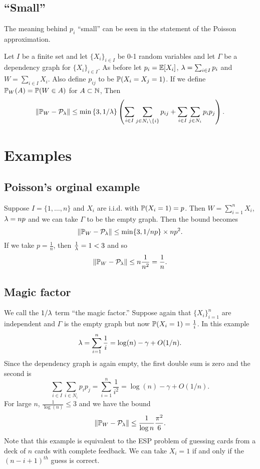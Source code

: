 \subsection{``Small''}
The meaning behind $p_i$ ``small'' can be seen in the statement of the Poisson approximation.
\begin{thrm}
    Let $I$ be a finite set and let $\{X_i\}_{i\in I}$ be 0-1 random variables and let $\Gamma$ be a dependency graph for $\{X_i\}_{i \in I}$. As before let $p_i = {\mathbb{E}}[X_i]$, $\lambda = \sum_{i \in I} p_i$ and $W = \sum_{i \in I}X_i$. Also define $p_{ij}$ to be ${\mathbb{P}}(X_i=X_j=1)$. If we define ${\mathbb{P}}_W(A) = {\mathbb{P}}(W \in A)$ for $A \subset {{\mathbb N}}$, Then 
    \[\left\|{\mathbb{P}}_W-{\mathcal{P}}_\lambda\right\| \le \min\left\{3, 1/\lambda\right\}\left(\sum_{i \in I}\sum_{j \in N_i \setminus \{i\}} p_{ij}+\sum_{i\in I}\sum_{j \in N_i}p_ip_j\right).\]
\end{thrm}
\section{Examples}
\subsection{Poisson's orginal example}
Suppose $I = \{1,\ldots,n\}$ and $X_i$ are i.i.d. with ${\mathbb{P}}(X_i=1)=p$. Then $W = \sum_{i=1}^n X_i$, $\lambda = np$ and we can take $\Gamma$ to be the empty graph. Then the bound becomes 
\[\left\|{\mathbb{P}}_W-{\mathcal{P}}_\lambda\right\| \le \min\{3,1/np\} \times np^2. \]
If we take $p = \frac{1}{n}$, then $\frac{1}{\lambda}=1<3$ and so 
\[\left\|{\mathbb{P}}_W - {\mathcal{P}}_\lambda\right\| \le n\frac{1}{n^2}=\frac{1}{n}. \]
\subsection{Magic factor}
We call the $1/\lambda$ term ``the magic factor.'' Suppose again that $\{X_i\}_{i=1}^n$ are independent and $\Gamma$ is the empty graph but now ${\mathbb{P}}(X_i=1)=\frac{1}{i}$. In this example
\[\lambda = \sum_{i=1}^n \frac{1}{i} = \log(n)-\gamma + O(1/n). \]
Since the dependency graph is again empty, the first double sum is zero and the second is
\[\sum_{i\in I}\sum_{i \in N_i} p_ip_j = \sum_{i=1}^n \frac{1}{i^2} = \log(n)-\gamma + O(1/n). \]
For large $n$, $\frac{1}{\log(n)} \le 3$ and we have the bound 
\[\left\|{\mathbb{P}}_W - {\mathcal{P}}_\lambda\right\| \le \frac{1}{\log n}\frac{\pi^2}{6}. \]
Note that this example is equivalent to the ESP problem of guessing cards from a deck of $n$ cards with complete feedback. We can take $X_i = 1$ if and only if the $(n-i+1)^{th}$ guess is correct.
